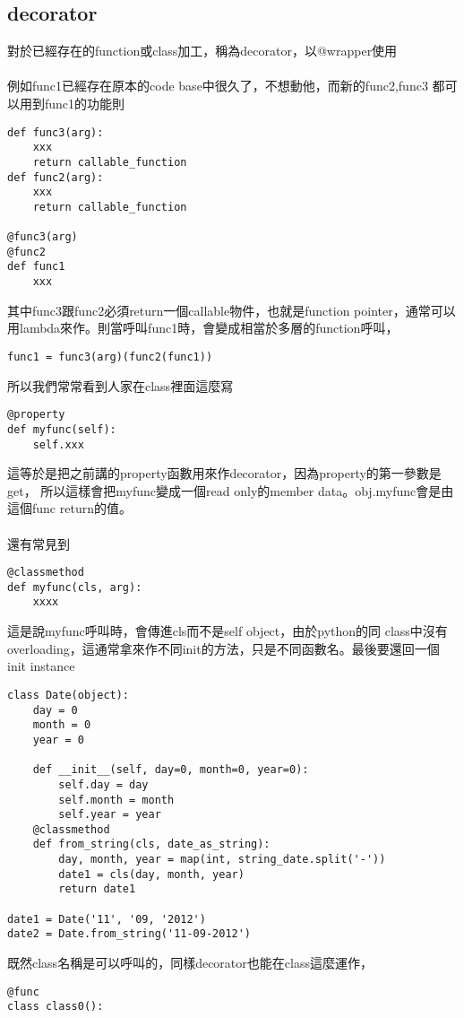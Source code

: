   \subsection{decorator}
  對於已經存在的function或class加工，稱為decorator，以@wrapper使用
  \\\\
  例如func1已經存在原本的code base中很久了，不想動他，而新的func2,func3
  都可以用到func1的功能則
\begin{verbatim}
def func3(arg):
    xxx
    return callable_function
def func2(arg):
    xxx
    return callable_function

@func3(arg)
@func2
def func1
    xxx
\end{verbatim}
  其中func3跟func2必須return一個callable物件，也就是function pointer，通常可以
  用lambda來作。則當呼叫func1時，會變成相當於多層的function呼叫，
\begin{verbatim}
func1 = func3(arg)(func2(func1))
\end{verbatim}
  所以我們常常看到人家在class裡面這麼寫
\begin{verbatim}
@property
def myfunc(self):
    self.xxx
\end{verbatim}
  這等於是把之前講的property函數用來作decorator，因為property的第一參數是get，
  所以這樣會把myfunc變成一個read only的member data。obj.myfunc會是由這個func
  return的值。
\\\\
  還有常見到
\begin{verbatim}
@classmethod
def myfunc(cls, arg):
    xxxx
\end{verbatim}
  這是說myfunc呼叫時，會傳進cls而不是self object，由於python的同 class中沒有
  overloading，這通常拿來作不同init的方法，只是不同函數名。最後要還回一個
  init instance
\begin{verbatim}
class Date(object):
    day = 0
    month = 0
    year = 0

    def __init__(self, day=0, month=0, year=0):
        self.day = day
        self.month = month
        self.year = year
    @classmethod
    def from_string(cls, date_as_string):
        day, month, year = map(int, string_date.split('-'))
        date1 = cls(day, month, year)
        return date1

date1 = Date('11', '09, '2012')
date2 = Date.from_string('11-09-2012')
\end{verbatim}
  既然class名稱是可以呼叫的，同樣decorator也能在class這麼運作，
\begin{verbatim}
@func
class class0():
\end{verbatim}
